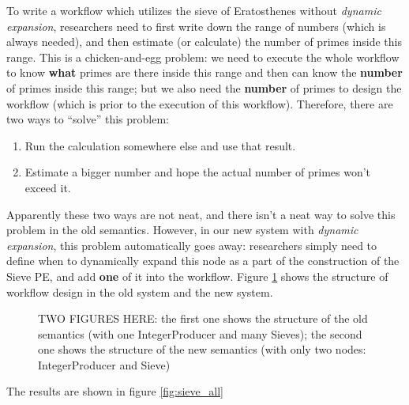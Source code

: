 To write a workflow which utilizes the sieve of Eratosthenes without \emph{dynamic expansion},  researchers need to first write down the range of numbers (which is always needed), and then estimate (or calculate) the number of primes inside this range. This is a chicken-and-egg problem: we need to execute the whole workflow to know \textbf{what} primes are there inside this range and then can know the \textbf{number} of primes inside this range; but we also need the \textbf{number} of primes to design the workflow (which is prior to the execution of this workflow). Therefore, there are two ways to ``solve'' this problem:
\begin{enumerate}
	\item Run the calculation somewhere else and use that result.
	\item Estimate a bigger number and hope the actual number of primes won't exceed it.
\end{enumerate}

Apparently these two ways are not neat, and there isn't a neat way to solve this problem in the old semantics. However, in our new system with \emph{dynamic expansion}, this problem automatically goes away: researchers simply need to define when to dynamically expand this node as a part of the construction of the Sieve PE, and add \textbf{one} of it into the workflow. Figure \ref{fig:comp_old_new_sieve} shows the structure of workflow design in the old system and the new system.

\begin{figure}[h]
\caption{
TWO FIGURES HERE:
the first one shows the structure of the old semantics (with one IntegerProducer and many Sieves);
	the second one shows the structure of the new semantics (with only two nodes: IntegerProducer and Sieve)
}
	\label{fig:comp_old_new_sieve}
\end{figure}

The results are shown in figure \ref{fig:sieve_all}

